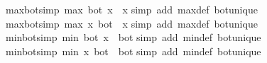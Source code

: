 \begin{isabellebody}
\endisatagproof
{\isafoldproof}%
%
\isadelimproof
\isanewline
%
\endisadelimproof
\isanewline
{}\isamarkupfalse%
\ max{\isacharunderscore}{\kern0pt}bot{\isacharbrackleft}{\kern0pt}simp{\isacharbrackright}{\kern0pt}{\isacharcolon}{\kern0pt}\ {\isachardoublequoteopen}max\ bot\ x\ {\isacharequal}{\kern0pt}\ x{\isachardoublequoteclose}\isanewline
%
\isadelimproof
%
\endisadelimproof
%
\isatagproof
{}\isamarkupfalse%
{\isacharparenleft}{\kern0pt}simp\ add{\isacharcolon}{\kern0pt}\ max{\isacharunderscore}{\kern0pt}def\ bot{\isacharunderscore}{\kern0pt}unique{\isacharparenright}{\kern0pt}%
\endisatagproof
{\isafoldproof}%
%
\isadelimproof
\isanewline
%
\endisadelimproof
\isanewline
{}\isamarkupfalse%
\ max{\isacharunderscore}{\kern0pt}bot{}{\isacharbrackleft}{\kern0pt}simp{\isacharbrackright}{\kern0pt}{\isacharcolon}{\kern0pt}\ {\isachardoublequoteopen}max\ x\ bot\ {\isacharequal}{\kern0pt}\ x{\isachardoublequoteclose}\isanewline
%
\isadelimproof
%
\endisadelimproof
%
\isatagproof
{}\isamarkupfalse%
{\isacharparenleft}{\kern0pt}simp\ add{\isacharcolon}{\kern0pt}\ max{\isacharunderscore}{\kern0pt}def\ bot{\isacharunderscore}{\kern0pt}unique{\isacharparenright}{\kern0pt}%
\endisatagproof
{\isafoldproof}%
%
\isadelimproof
\isanewline
%
\endisadelimproof
\isanewline
{}\isamarkupfalse%
\ min{\isacharunderscore}{\kern0pt}bot{\isacharbrackleft}{\kern0pt}simp{\isacharbrackright}{\kern0pt}{\isacharcolon}{\kern0pt}\ {\isachardoublequoteopen}min\ bot\ x\ {\isacharequal}{\kern0pt}\ bot{\isachardoublequoteclose}\isanewline
%
\isadelimproof
%
\endisadelimproof
%
\isatagproof
{}\isamarkupfalse%
{\isacharparenleft}{\kern0pt}simp\ add{\isacharcolon}{\kern0pt}\ min{\isacharunderscore}{\kern0pt}def\ bot{\isacharunderscore}{\kern0pt}unique{\isacharparenright}{\kern0pt}%
\endisatagproof
{\isafoldproof}%
%
\isadelimproof
\isanewline
%
\endisadelimproof
\isanewline
{}\isamarkupfalse%
\ min{\isacharunderscore}{\kern0pt}bot{}{\isacharbrackleft}{\kern0pt}simp{\isacharbrackright}{\kern0pt}{\isacharcolon}{\kern0pt}\ {\isachardoublequoteopen}min\ x\ bot\ {\isacharequal}{\kern0pt}\ bot{\isachardoublequoteclose}\isanewline
%
\isadelimproof
%
\endisadelimproof
%
\isatagproof
{}\isamarkupfalse%
{\isacharparenleft}{\kern0pt}simp\ add{\isacharcolon}{\kern0pt}\ min{\isacharunderscore}{\kern0pt}def\ bot{\isacharunderscore}{\kern0pt}unique{\isacharparenright}{\kern0pt}%
\endisatagproof
{\isafoldproof}%
%
\isadelimproof
\isanewline
%
\endisadelimproof
\isanewline

\end{isabellebody}
